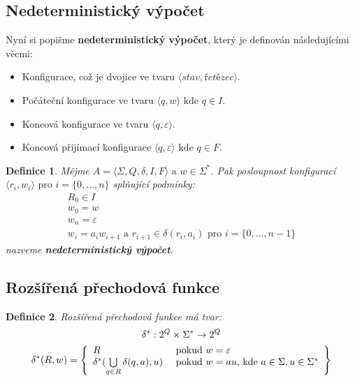 \documentclass[10pt, a4paper, titlepage]{article}
\theoremstyle{note}
\newtheorem{definice}{Definice}
\begin{document}
\subsection{Nedeterministický výpočet}
Nyní si popišme \textbf{nedeterministický výpočet}, který je definován následujícími věcmi:
\begin{itemize}
\item
Konfigurace, což je dvojice ve tvaru $\langle \textit{stav}, \textit{řetězec} \rangle $.
\item
Počáteční konfigurace ve tvaru $\langle q, w \rangle \text{ kde } q \in I$.
\item
Koncová konfigurace ve tvaru $\langle q, \varepsilon \rangle $.
\item
Koncová přijímací konfigurace $\langle q, \varepsilon \rangle \text{ kde } q \in F$.
\end{itemize}

\begin{definice}
Mějme $A = \langle \Sigma, Q, \delta, I, F \rangle  \text{ a } w \in \Sigma^{*}$. Pak posloupnost konfigurací $\langle r_{i}, w_{i} \rangle \text{ pro } i = \lbrace 0, \ldots, n \rbrace $ splňující podmínky:
\begin{gather}
R_{0} \in I \\
w_{0} = w \\
w_{n} = \varepsilon \\
w_{i} = a_{i}w_{i+1} \text{ a } r_{i+1} \in \delta (r_{i}, a_{i}) \text{ pro } i = \lbrace 0, \ldots,  n-1 \rbrace
\end{gather}
nazveme \textbf{nedeterministický výpočet}.
\end{definice}

\subsection{Rozšířená přechodová funkce}
\begin{definice}
Rozšířená přechodová funkce má tvar:
\begin{gather*}
\delta^{*} : 2^{Q} \times \Sigma^{*} \rightarrow 2^{Q} \\
\delta^{*}(R, w) = \left\lbrace
\begin{array}{l l}
R & \text{ pokud } w = \varepsilon \\
\delta^{*}(\bigcup\limits_{q \in R} \delta(q, a), u) & \text{ pokud } w = au\text{, kde } a \in \Sigma, u \in \Sigma^{*} \\
\end{array}
\right\rbrace
\end{gather*}
\end{definice}
\end{document}
